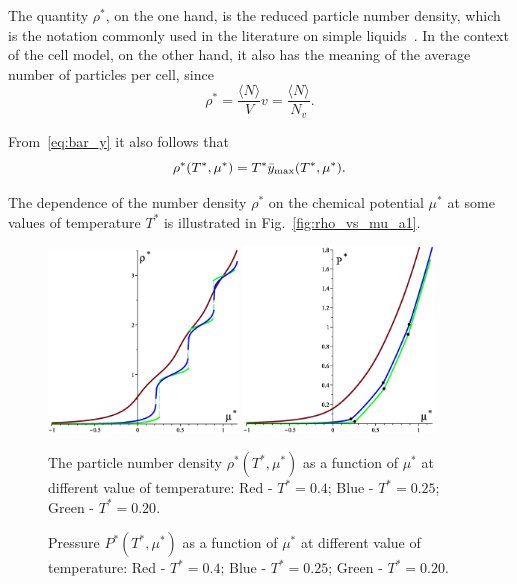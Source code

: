 \documentclass[12pt]{article}
\numberwithin{equation}{section}
\begin{document}
	The quantity $\rho^*$, on the one hand, is the reduced particle number density, which is the notation commonly used in the literature on simple liquids~\cite{HansenMcDonald13}. In the context of the cell model, on the other hand, it also has the meaning of the average number of particles per cell, since
	\begin{equation}
		\rho^* = \frac{\langle N \rangle}{V} v = \frac{\langle N \rangle}{N_v}.
	\end{equation}
	
	From~\eqref{eq:bar_y} it also follows that
	\begin{equation}
		\label{rho_vs_T_mu}
		\rho^*(T^*,\mu^*) = T^* \bar{y}_{\rm max}(T^*,\mu^*).
	\end{equation}
	
	The dependence of the number density $\rho^*$ on the chemical potential $\mu^*$ at some values of temperature $T^*$ is illustrated in Fig.~\ref{fig:rho_vs_mu_a1}.
	
	\begin{figure}[htbp]
		\includegraphics[width=0.45\textwidth,angle=0]{images/rho_vs_mu_a1}
		\hfill
		\includegraphics[width=0.45\textwidth,angle=0]{images/p_vs_mu_a1}
		\\
		\parbox{0.45\textwidth}{\caption{\label{fig:rho_vs_mu_a1} The particle number density $\rho^*(T^*,\mu^*)$ as a function of $\mu^*$ at different value of temperature: Red - $T^*=0.4$; Blue - $T^*=0.25$; Green - $T^*=0.20$.}}
		\hfill
		\parbox{0.45\textwidth}{\caption{\label{fig:p_vs_mu_a1} Pressure $P^*(T^*,\mu^*)$ as a function of $\mu^*$ at different value of temperature: Red - $T^*=0.4$; Blue - $T^*=0.25$; Green - $T^*=0.20$.}}
	\end{figure}
	
\end{document}
